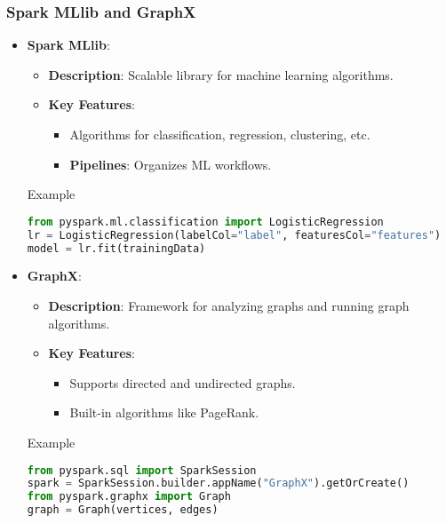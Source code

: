 \documentclass[aspectratio=169]{beamer}
\begin{document}
\begin{frame}[fragile]
    \frametitle{Spark MLlib and GraphX}
    \begin{itemize}
        \item \textbf{Spark MLlib}:
            \begin{itemize}
                \item \textbf{Description}: Scalable library for machine learning algorithms.
                \item \textbf{Key Features}:
                    \begin{itemize}
                        \item Algorithms for classification, regression, clustering, etc.
                        \item \textbf{Pipelines}: Organizes ML workflows.
                    \end{itemize}
            \end{itemize}
        \begin{block}{Example}
            \begin{lstlisting}[language=Python]
from pyspark.ml.classification import LogisticRegression
lr = LogisticRegression(labelCol="label", featuresCol="features")
model = lr.fit(trainingData)
            \end{lstlisting}
        \end{block}

        \item \textbf{GraphX}:
            \begin{itemize}
                \item \textbf{Description}: Framework for analyzing graphs and running graph algorithms.
                \item \textbf{Key Features}:
                    \begin{itemize}
                        \item Supports directed and undirected graphs.
                        \item Built-in algorithms like PageRank.
                    \end{itemize}
            \end{itemize}
        \begin{block}{Example}
            \begin{lstlisting}[language=Python]
from pyspark.sql import SparkSession
spark = SparkSession.builder.appName("GraphX").getOrCreate()
from pyspark.graphx import Graph
graph = Graph(vertices, edges)
            \end{lstlisting}
        \end{block}
    \end{itemize}
\end{frame}
\end{document}

